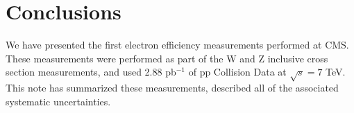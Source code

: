
\section{Conclusions}
We have presented the first electron efficiency measurements performed at CMS. These measurements were performed as part of the W and Z inclusive cross section measurements, and used 2.88 pb$^{-1}$ of pp Collision Data at $\sqrt s = 7$ TeV. This note has summarized these measurements, described all of the associated systematic uncertainties.


